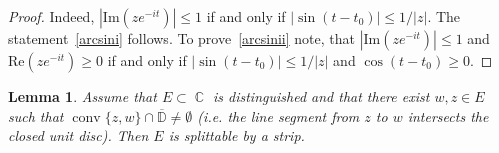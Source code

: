 \documentclass[10pt,a4paper]{amsart}
\newtheorem{lemma}{Lemma}
\DeclareMathOperator{\CC}{\mathbb C}
\DeclareMathOperator{\conv}{conv}
\begin{document}
	\begin{proof}
		Indeed, $|\mathrm{Im}(ze^{-it})| \le 1$ if and only if $|\sin(t - t_0)| \le 1/|z|$. The statement~\ref{arcsini} follows. To prove~\ref{arcsinii} note, that $|\mathrm{Im}(ze^{-it})| \le 1$ and $\mathrm{Re}(ze^{-it}) \ge 0$ if and only if $|\sin(t - t_0)| \le 1/|z|$ and $\cos(t - t_0) \ge 0$.
	\end{proof}

	\begin{lemma}\label{lemIfNotAsteriskThenNoOppositeStrips}
		Assume that $E \subset \CC$ is distinguished and that there exist $w,z \in E$ such that $\conv\{z, w\} \cap \overline{\mathbb D} \ne \emptyset$ (i.e. the line segment from $z$ to $w$ intersects the closed unit disc). Then $E$ is splittable by a strip.
	\end{lemma}
\end{document}
